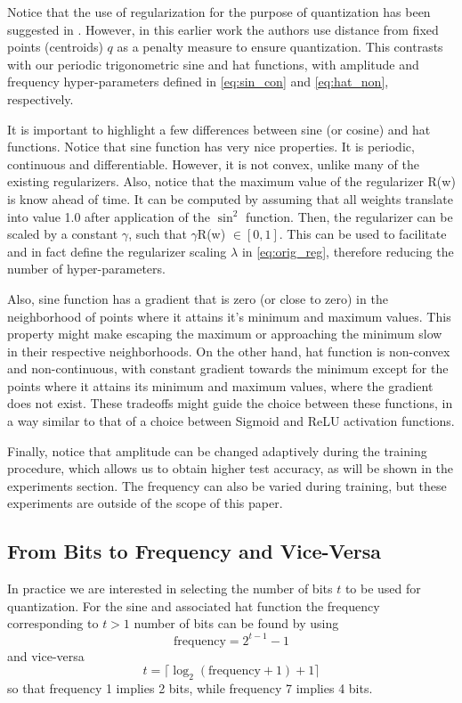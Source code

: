 \documentclass{article}
\begin{document}
Notice that the use of regularization for the purpose of quantization has been suggested in \cite{Hung2015}. However, in this earlier work the authors use distance from fixed points (centroids) $q$ as a penalty measure to ensure quantization. This contrasts with our periodic trigonometric sine and hat functions, with amplitude and frequency hyper-parameters defined in \eqref{eq:sin_con} and \eqref{eq:hat_non}, respectively. 

It is important to highlight a few differences between sine (or cosine) and hat functions. Notice that sine function has very nice properties. It is periodic, continuous and differentiable. However, it is not convex, unlike many of the existing regularizers. Also, notice that the maximum value of the regularizer R(w) is know ahead of time. It can be computed by assuming that all weights translate into value 1.0 after application of the $\sin^2$ function. Then, the regularizer can be scaled by a constant $\gamma$, such that $\gamma$R(w) $\in [0,1]$. This can be used to facilitate and in fact define the regularizer scaling $\lambda$ in \eqref{eq:orig_reg}, therefore reducing the number of hyper-parameters.

Also, sine function has a gradient that is zero (or close to zero) in the neighborhood of points where it attains it's minimum and maximum values. This property might make escaping the maximum or approaching the minimum slow in their respective neighborhoods. On the other hand, hat function is non-convex and non-continuous, with constant gradient towards the minimum except for the points where it attains its minimum and maximum values, where the gradient does not exist. These tradeoffs might guide the choice between these functions, in a way similar to that of a choice between Sigmoid and ReLU activation functions.
 
Finally, notice that amplitude can be changed adaptively during the training procedure, which allows us to obtain higher test accuracy, as will be shown in the experiments section. The frequency can also be varied during training, but these experiments are outside of the scope of this paper.  

\subsection{From Bits to Frequency and Vice-Versa} 
In practice we are interested in selecting the number of bits $t$ to be used for quantization. For the sine and associated hat function the frequency corresponding to $t>1$ number of bits can be found by using
\begin{equation}
\text{frequency} =  2^{t - 1} - 1
\end{equation}
and vice-versa
\begin{equation}
t = \lceil \log_2 (\text{frequency} + 1) + 1 \rceil
\end{equation}
so that frequency 1 implies 2 bits, while frequency 7 implies 4 bits.
\end{document}
